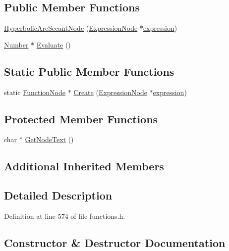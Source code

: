 \subsection*{Public Member Functions}
\begin{DoxyCompactItemize}
\item 
\hyperlink{classHyperbolicArcSecantNode_a07e699822af1ff2ab863550b3f0a50c2}{Hyperbolic\+Arc\+Secant\+Node} (\hyperlink{classExpressionNode}{Expression\+Node} $\ast$\hyperlink{classFunctionNode_ad7577b179a1937aaf8a0058bb5b546dc}{expression})
\item 
\hyperlink{structNumber}{Number} $\ast$ \hyperlink{classHyperbolicArcSecantNode_a1432e0c3a61b8418994289e11cb7f1a0}{Evaluate} ()
\end{DoxyCompactItemize}
\subsection*{Static Public Member Functions}
\begin{DoxyCompactItemize}
\item 
static \hyperlink{classFunctionNode}{Function\+Node} $\ast$ \hyperlink{classHyperbolicArcSecantNode_a767d2539da79424ae9d5b8a004995cbc}{Create} (\hyperlink{classExpressionNode}{Expression\+Node} $\ast$\hyperlink{classFunctionNode_ad7577b179a1937aaf8a0058bb5b546dc}{expression})
\end{DoxyCompactItemize}
\subsection*{Protected Member Functions}
\begin{DoxyCompactItemize}
\item 
char $\ast$ \hyperlink{classHyperbolicArcSecantNode_a4585803d2a87bc7de7f5260187139865}{Get\+Node\+Text} ()
\end{DoxyCompactItemize}
\subsection*{Additional Inherited Members}


\subsection{Detailed Description}


Definition at line 574 of file functions.\+h.



\subsection{Constructor \& Destructor Documentation}
